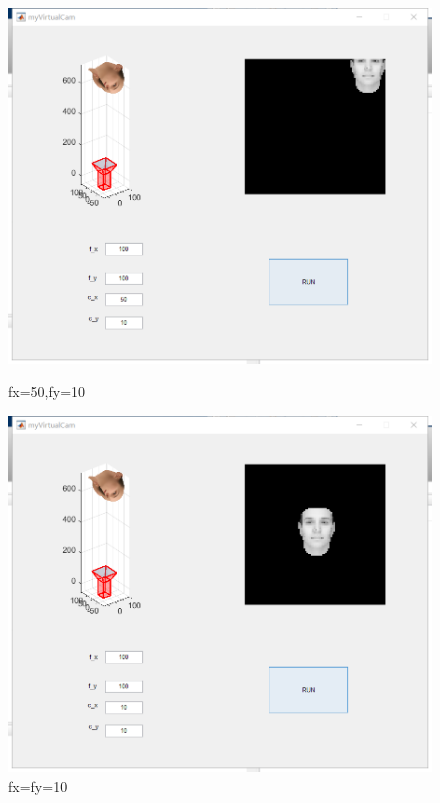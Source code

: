 \documentclass{xcumcmart}
\begin{document}
\begin{figure}
\begin{minipage}[htbp]{0.48\linewidth}
    \centering
	\includegraphics[width=1\textwidth]{fig/1151.png}
	\caption{fx=50,fy=10\label{fig:1151}}
\end{minipage}
\hfill
\begin{minipage}[htbp]{0.48\linewidth}
    \centering
	\includegraphics[width=1\textwidth]{fig/1111.png}
	\caption{fx=fy=10\label{fig:1111}}
\end{minipage}
\end{figure}
\end{document}
